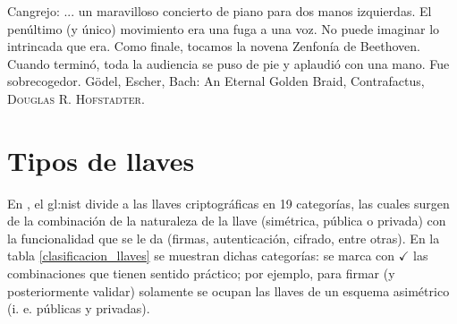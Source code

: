 %
%

{
  \epigrafe
  {%
    Cangrejo: ... un maravilloso concierto de piano para dos manos izquierdas.
    El penúltimo (y único) movimiento era una fuga a una voz. No puede imaginar
    lo intrincada que era. Como finale, tocamos la novena Zenfonía de Beethoven.
    Cuando terminó, toda la audiencia se puso de pie y aplaudió con una mano.
    Fue sobrecogedor.
  }
  {%
    Gödel, Escher, Bach: An Eternal Golden Braid, Contrafactus,
    \textsc{Douglas R. Hofstadter}.%
  }
}

\section{Tipos de llaves}

En \cite{nist_llaves}, el \gls{gl:nist} divide a las llaves criptográficas en
19 categorías, las cuales surgen de la combinación de la naturaleza de la
llave (simétrica, pública o privada) con la funcionalidad que se le da
(firmas, autenticación, cifrado, entre otras). En la tabla
\ref{clasificacion_llaves} se muestran dichas categorías: se marca con
$ \checkmark $ las combinaciones que tienen sentido práctico; por ejemplo, para
firmar (y posteriormente validar) solamente se ocupan las llaves de un esquema
asimétrico (i. e. públicas y privadas).

